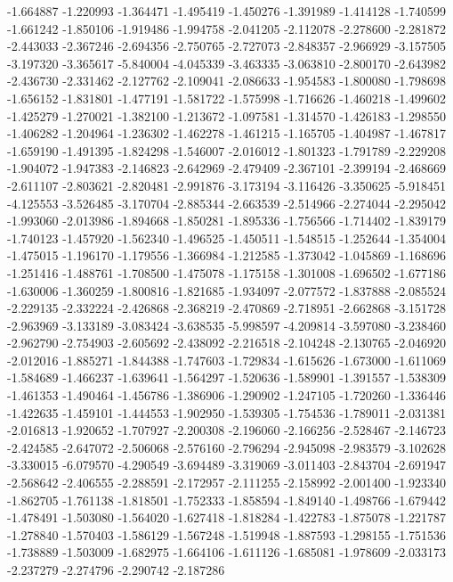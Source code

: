 -1.664887
-1.220993
-1.364471
-1.495419
-1.450276
-1.391989
-1.414128
-1.740599
-1.661242
-1.850106
-1.919486
-1.994758
-2.041205
-2.112078
-2.278600
-2.281872
-2.443033
-2.367246
-2.694356
-2.750765
-2.727073
-2.848357
-2.966929
-3.157505
-3.197320
-3.365617
-5.840004
-4.045339
-3.463335
-3.063810
-2.800170
-2.643982
-2.436730
-2.331462
-2.127762
-2.109041
-2.086633
-1.954583
-1.800080
-1.798698
-1.656152
-1.831801
-1.477191
-1.581722
-1.575998
-1.716626
-1.460218
-1.499602
-1.425279
-1.270021
-1.382100
-1.213672
-1.097581
-1.314570
-1.426183
-1.298550
-1.406282
-1.204964
-1.236302
-1.462278
-1.461215
-1.165705
-1.404987
-1.467817
-1.659190
-1.491395
-1.824298
-1.546007
-2.016012
-1.801323
-1.791789
-2.229208
-1.904072
-1.947383
-2.146823
-2.642969
-2.479409
-2.367101
-2.399194
-2.468669
-2.611107
-2.803621
-2.820481
-2.991876
-3.173194
-3.116426
-3.350625
-5.918451
-4.125553
-3.526485
-3.170704
-2.885344
-2.663539
-2.514966
-2.274044
-2.295042
-1.993060
-2.013986
-1.894668
-1.850281
-1.895336
-1.756566
-1.714402
-1.839179
-1.740123
-1.457920
-1.562340
-1.496525
-1.450511
-1.548515
-1.252644
-1.354004
-1.475015
-1.196170
-1.179556
-1.366984
-1.212585
-1.373042
-1.045869
-1.168696
-1.251416
-1.488761
-1.708500
-1.475078
-1.175158
-1.301008
-1.696502
-1.677186
-1.630006
-1.360259
-1.800816
-1.821685
-1.934097
-2.077572
-1.837888
-2.085524
-2.229135
-2.332224
-2.426868
-2.368219
-2.470869
-2.718951
-2.662868
-3.151728
-2.963969
-3.133189
-3.083424
-3.638535
-5.998597
-4.209814
-3.597080
-3.238460
-2.962790
-2.754903
-2.605692
-2.438092
-2.216518
-2.104248
-2.130765
-2.046920
-2.012016
-1.885271
-1.844388
-1.747603
-1.729834
-1.615626
-1.673000
-1.611069
-1.584689
-1.466237
-1.639641
-1.564297
-1.520636
-1.589901
-1.391557
-1.538309
-1.461353
-1.490464
-1.456786
-1.386906
-1.290902
-1.247105
-1.720260
-1.336446
-1.422635
-1.459101
-1.444553
-1.902950
-1.539305
-1.754536
-1.789011
-2.031381
-2.016813
-1.920652
-1.707927
-2.200308
-2.196060
-2.166256
-2.528467
-2.146723
-2.424585
-2.647072
-2.506068
-2.576160
-2.796294
-2.945098
-2.983579
-3.102628
-3.330015
-6.079570
-4.290549
-3.694489
-3.319069
-3.011403
-2.843704
-2.691947
-2.568642
-2.406555
-2.288591
-2.172957
-2.111255
-2.158992
-2.001400
-1.923340
-1.862705
-1.761138
-1.818501
-1.752333
-1.858594
-1.849140
-1.498766
-1.679442
-1.478491
-1.503080
-1.564020
-1.627418
-1.818284
-1.422783
-1.875078
-1.221787
-1.278840
-1.570403
-1.586129
-1.567248
-1.519948
-1.887593
-1.298155
-1.751536
-1.738889
-1.503009
-1.682975
-1.664106
-1.611126
-1.685081
-1.978609
-2.033173
-2.237279
-2.274796
-2.290742
-2.187286

